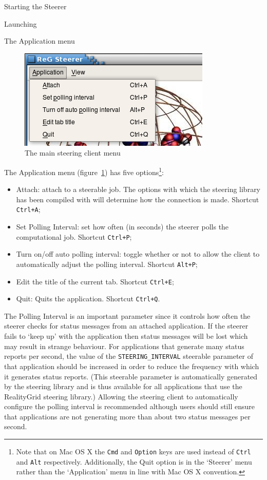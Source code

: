 \documentclass[a4paper,twoside]{article}
\begin{document}
\begin{section}{Starting the Steerer}
\begin{subsection}{Launching}
\end{subsection}


\begin{subsection}{The Application menu}


\begin{figure}
\centerline{\includegraphics{app_menu.png}}
\caption{The main steering client menu}
\label{fig:steerer_menu}
\end{figure}

The Application menu (figure~\ref{fig:steerer_menu}) has five
options\footnote{Note that on Mac OS X the \texttt{Cmd} and
  \texttt{Option} keys are used instead of \texttt{Ctrl} and
  \texttt{Alt} respectively. Additionally, the Quit option is in the
  `Steerer' menu rather than the `Application' menu in line with Mac
  OS X convention.}:
\begin{itemize}
\item Attach: attach to a steerable job. The options with which the
  steering library has been compiled with will determine how the
  connection is made. Shortcut \texttt{Ctrl+A};
\item Set Polling Interval: set how often (in seconds) the
steerer polls the computational job. Shortcut \texttt{Ctrl+P};
\item Turn on/off auto polling interval: toggle whether or not
to allow the client to automatically adjust the polling
interval. Shortcut \texttt{Alt+P};
\item Edit the title of the current tab. Shortcut \texttt{Ctrl+E};
\item Quit: Quits the application. Shortcut \texttt{Ctrl+Q}.
\end{itemize}

The Polling Interval is an important parameter since it controls how
often the steerer checks for status messages from an attached
application.  If the steerer fails to `keep up' with the application
then status messages will be lost which may result in strange
behaviour.  For applications that generate many status reports per
second, the value of the \texttt{STEERING\_INTERVAL} steerable
parameter of that application should be increased in order to reduce
the frequency with which it generates status reports. (This steerable
parameter is automatically generated by the steering library and is
thus available for all applications that use the RealityGrid steering
library.)  Allowing the steering client to automatically configure the
polling interval is recommended although users should still ensure
that applications are not generating more than about two status
messages per second.


\end{subsection}
\end{section}
\end{document}
